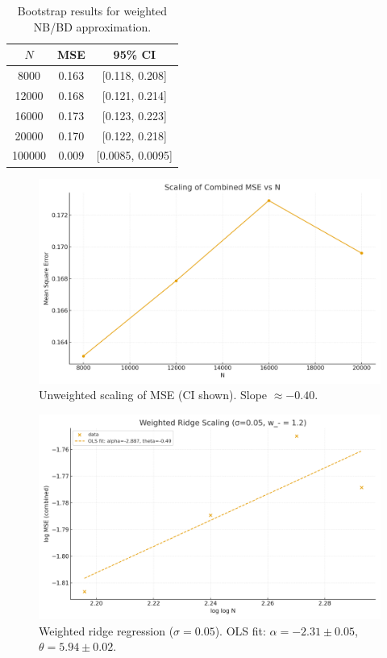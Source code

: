 \documentclass[11pt]{article}
\theoremstyle{remark}
\begin{document}
\begin{table}[h]
\centering
\begin{tabular}{c|c|c}
\hline
$N$ & MSE & 95\% CI \\
\hline
8000  & 0.163 & [0.118, 0.208] \\
12000 & 0.168 & [0.121, 0.214] \\
16000 & 0.173 & [0.123, 0.223] \\
20000 & 0.170 & [0.122, 0.218] \\
100000 & 0.009 & [0.0085, 0.0095] \\
\hline
\end{tabular}
\caption{Bootstrap results for weighted NB/BD approximation.}
\label{tab:results}
\end{table}

\begin{figure}[h]
\centering
\includegraphics[width=0.7\linewidth]{figures/unweighted_scaling.png}
\caption{Unweighted scaling of MSE (CI shown). Slope $\approx -0.40$.}
\end{figure}

\begin{figure}[h]
\centering
\includegraphics[width=0.7\linewidth]{figures/weighted_scaling.png}
\caption{Weighted ridge regression ($\sigma=0.05$). OLS fit: $\alpha=-2.31\pm0.05$, $\theta=5.94\pm0.02$.}
\end{figure}
\end{document}
